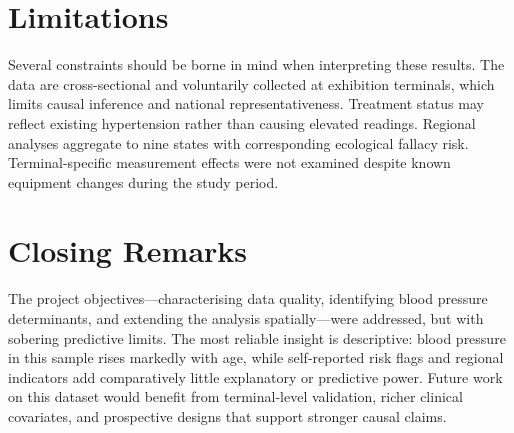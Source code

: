 \section{Limitations}
\label{sec:conclusion_limitations}

Several constraints should be borne in mind when interpreting these results. The data are cross-sectional and voluntarily collected at exhibition terminals, which limits causal inference and national representativeness. Treatment status may reflect existing hypertension rather than causing elevated readings. Regional analyses aggregate to nine states with corresponding ecological fallacy risk. Terminal-specific measurement effects were not examined despite known equipment changes during the study period.

\section{Closing Remarks}
\label{sec:conclusion_remarks}

The project objectives---characterising data quality, identifying blood pressure determinants, and extending the analysis spatially---were addressed, but with sobering predictive limits. The most reliable insight is descriptive: blood pressure in this sample rises markedly with age, while self-reported risk flags and regional indicators add comparatively little explanatory or predictive power. Future work on this dataset would benefit from terminal-level validation, richer clinical covariates, and prospective designs that support stronger causal claims.
